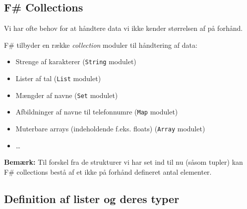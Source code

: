 \documentclass[rgb]{beamer}
\begin{document}
\popmaketitleframe

\subsection{F\# Collections}

\begin{frame}
\begin{footnotesize}

  \vspace{1ex}

  Vi har ofte behov for at håndtere data vi ikke kender størrelsen af
  på forhånd.
  \vspace{2mm}

  F\# tilbyder en række \emph{collection} moduler til håndtering af data:

  \begin{itemize}
  \item Strenge af karakterer (\lstinline{String} modulet)
  \item Lister af tal (\lstinline{List} modulet)
  \item Mængder af navne (\lstinline{Set} modulet)
  \item Afbildninger af navne til telefonnumre (\lstinline{Map} modulet)
  \item Muterbare arrays (indeholdende f.eks. floats) (\lstinline{Array} modulet)
  \item \ldots
  \end{itemize}

  \vspace{2mm}
  \textbf{Bemærk:} Til forskel fra de strukturer vi har set ind til nu
  (såsom tupler) kan F\# collections bestå af et ikke på forhånd defineret
  antal elementer.

\end{footnotesize}
\end{frame}

\subsection{Definition af lister og deres typer}
\end{document}
